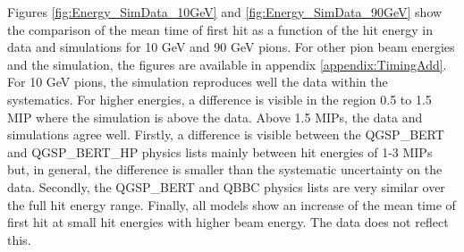 Figures \ref{fig:Energy_SimData_10GeV} and \ref{fig:Energy_SimData_90GeV} show the comparison of the mean time of first hit as a function of the hit energy in data and simulations for 10 GeV and 90 GeV pions. For other pion beam energies and the \ddhep simulation, the figures are available in appendix \ref{appendix:TimingAdd}. For 10 GeV pions, the simulation reproduces well the data within the systematics. For higher energies, a difference is visible in the region 0.5 to 1.5 MIP where the simulation is above the data. Above 1.5 MIPs, the data and simulations agree well. Firstly, a difference is visible between the QGSP\_BERT and QGSP\_BERT\_HP physics lists mainly between hit energies of 1-3 MIPs but, in general, the difference is smaller than the systematic uncertainty on the data. Secondly, the QGSP\_BERT and QBBC physics lists are very similar over the full hit energy range. Finally, all models show an increase of the mean time of first hit at small hit energies with higher beam energy. The data does not reflect this.

